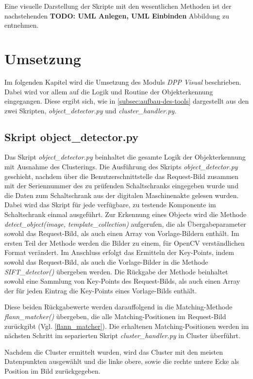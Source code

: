 \documentclass[
    type=Projektarbeit,
    status=draft, %
    language=german, %
    bibengine=bibtex,
]{unibwm-inf-thesis}
\newcommand{\todo}[1]{\textbf{TODO: #1}}
\begin{document}
    Eine visuelle Darstellung der Skripte mit den wesentlichen Methoden ist der nachstehenden
    \todo{UML Anlegen, UML Einbinden} Abbildung zu entnehmen.
    
    \section{Umsetzung}
    Im folgenden Kapitel wird die Umsetzung des Moduls \textit{DPP Visual} beschrieben.
    Dabei wird vor allem auf die Logik und Routine der Objekterkennung eingegangen.
    Diese ergibt sich, wie in \autoref{subsec:aufbau-des-tools} dargestellt aus den zwei Skripten, \textit{object\_detector.py} und \textit{cluster\_handler.py}.

    \subsection{Skript object\_detector.py}
    Das Skript \textit{object\_detector.py} beinhaltet die gesamte Logik der Objekterkennung mit Ausnahme des Clusterings.
    Die Ausführung des Skripts \textit{object\_detector.py} geschieht, nachdem über die Benutzerschnittstelle das Request-Bild zusammen mit der Seriennummer des zu prüfenden Schaltschranks eingegeben wurde und die Daten zum Schaltschrank aus der digitalen Maschinenakte gelesen wurden.
    Dabei wird das Skript für jede verfügbare, zu testende Komponente im Schaltschrank einmal ausgeführt.
    Zur Erkennung eines Objects wird die Methode \textit{detect\_object(image, template\_collection)} aufgerufen, die als Übergabeparameter sowohl das Request-Bild, als auch einen Array von Vorlage-Bildern enthält.
    Im ersten Teil der Methode werden die Bilder zu einem, für OpenCV verständlichen Format verändert.
    Im Anschluss erfolgt das Ermitteln der Key-Points, indem sowohl das Request-Bild, als auch die Vorlage-Bilder in die Methode \textit{SIFT\_detector()} übergeben werden.
    Die Rückgabe der Methode beinhaltet sowohl eine Sammlung von Key-Points des Request-Bilds, als auch einen Array der für jeden Eintrag die Key-Points eines Vorlage-Bilds enthält.

    Diese beiden Rückgabewerte werden darauffolgend in die Matching-Methode \textit{flann\_matcher()} übergeben, die alle Matching-Positionen im Request-Bild zurückgibt (Vgl. \autoref{flann_matcher}).
    Die erhaltenen Matching-Positionen werden im nächsten Schritt im separierten Skript \textit{cluster\_handler.py} in Cluster überführt.

    Nachdem die Cluster ermittelt wurden, wird das Cluster mit den meisten Datenpunkten ausgewählt und die linke obere, sowie die rechte untere Ecke als Position im Bild zurückgegeben.
\end{document}
